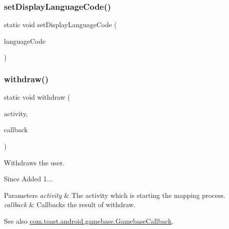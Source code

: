 \subsubsection{\texorpdfstring{set\+Display\+Language\+Code()}{setDisplayLanguageCode()}}
{\footnotesize\ttfamily static void set\+Display\+Language\+Code (\begin{DoxyParamCaption}\item[{String}]{language\+Code }\end{DoxyParamCaption})\hspace{0.3cm}{\ttfamily [static]}}

\mbox{\label{classcom_1_1toast_1_1android_1_1gamebase_1_1_gamebase_aaa0ce688f5b145c64fb3cc3ec7d496c7}} 
\subsubsection{\texorpdfstring{withdraw()}{withdraw()}}
{\footnotesize\ttfamily static void withdraw (\begin{DoxyParamCaption}\item[{@Non\+Null final Activity}]{activity,  }\item[{@Nullable final \hyperlink{interfacecom_1_1toast_1_1android_1_1gamebase_1_1_gamebase_callback}{Gamebase\+Callback}}]{callback }\end{DoxyParamCaption})\hspace{0.3cm}{\ttfamily [static]}}



Withdraws the user. 

\begin{DoxySince}{Since}
Added 1... 
\end{DoxySince}

\begin{DoxyParams}{Parameters}
{\em activity} & The activity which is starting the mapping process. \\
\hline
{\em callback} & Callbacks the result of withdraw. \\
\hline
\end{DoxyParams}
\begin{DoxySeeAlso}{See also}
\hyperlink{interfacecom_1_1toast_1_1android_1_1gamebase_1_1_gamebase_callback}{com.\+toast.\+android.\+gamebase.\+Gamebase\+Callback}. 
\end{DoxySeeAlso}
